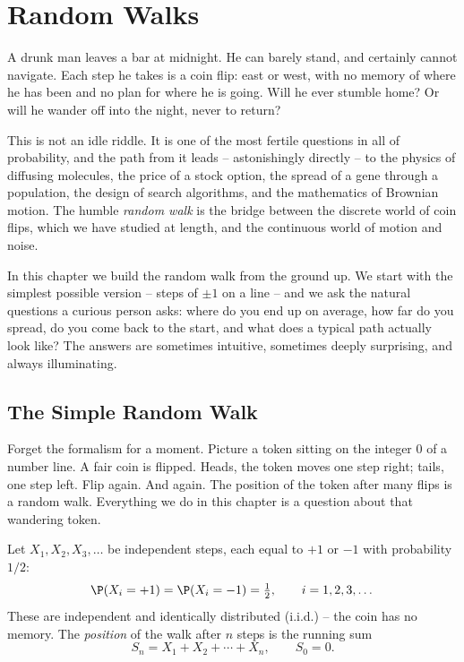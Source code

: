 \chapter{Random Walks}

A drunk man leaves a bar at midnight. He can barely stand, and certainly
cannot navigate. Each step he takes is a coin flip: east or west, with no
memory of where he has been and no plan for where he is going. Will he ever
stumble home? Or will he wander off into the night, never to return?

This is not an idle riddle. It is one of the most fertile questions in all of
probability, and the path from it leads -- astonishingly directly -- to the
physics of diffusing molecules, the price of a stock option, the spread of a
gene through a population, the design of search algorithms, and the
mathematics of Brownian motion. The humble \emph{random walk} is the bridge
between the discrete world of coin flips, which we have studied at length, and
the continuous world of motion and noise.

In this chapter we build the random walk from the ground up. We start with the
simplest possible version -- steps of $\pm 1$ on a line -- and we ask the
natural questions a curious person asks: where do you end up on average, how
far do you spread, do you come back to the start, and what does a typical path
actually look like? The answers are sometimes intuitive, sometimes deeply
surprising, and always illuminating.

\chapterline

\section{The Simple Random Walk}
\label{ch26:srw}

\begin{intuitionbox}
Forget the formalism for a moment. Picture a token sitting on the integer $0$
of a number line. A fair coin is flipped. Heads, the token moves one step
right; tails, one step left. Flip again. And again. The position of the token
after many flips is a random walk. Everything we do in this chapter is a
question about that wandering token.
\end{intuitionbox}

Let $X_1, X_2, X_3, \dots$ be independent steps, each equal to $+1$ or $-1$
with probability $1/2$:
\[
  \P(X_i = +1) = \P(X_i = -1) = \tfrac{1}{2}, \qquad i = 1, 2, 3, \dots
\]
These are independent and identically distributed (i.i.d.) -- the coin has no
memory. The \emph{position} of the walk after $n$ steps is the running sum
\[
  S_n = X_1 + X_2 + \cdots + X_n, \qquad S_0 = 0.
\]

